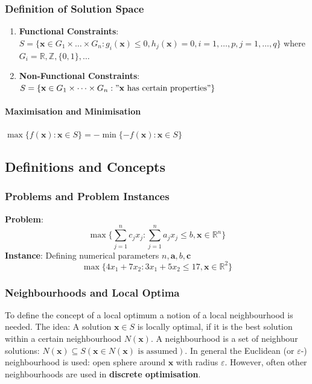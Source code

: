 \documentclass[11pt]{article}
\begin{document}
\subsubsection{Definition of Solution Space}
\begin{enumerate}[label=\roman*)]
	\item \textbf{Functional Constraints}:\\
	$S = \{ \textbf{x}\in G_1\times\dots\times G_n : g_i(\textbf{x})\leq 0, h_j (\textbf{x}) = 0, i=1,\dots,p,j=1,\dots,q \}$ where $G_i = \mathbb{R},\mathbb{Z},\{0,1\},\dots$
	\item \textbf{Non-Functional Constraints}:\\
	$S = \{ \textbf{x}\in G_1\times\dots\times G_n : "\textbf{x} \text{ has certain properties}" \} $
\end{enumerate}

\paragraph{Maximisation and Minimisation} $\max\{f(\textbf{x}):\textbf{x}\in S\} = - \min\{-f(\textbf{x}):\textbf{x}\in S\}$

\subsection{Definitions and Concepts}

\subsubsection{Problems and Problem Instances}
\textbf{Problem}:
\begin{equation*}
	\max\{\sum_{j=1}^{n}c_j x_j:\sum_{j=1}^{n}a_j x_j \leq b, \textbf{x}\in \mathbb{R}^n\}
\end{equation*}
\noindent
\textbf{Instance}: Defining numerical parameters $n,\textbf{a},b,\textbf{c}$
\begin{equation*}
\max\{4x_1 + 7 x_2 : 3x_1 + 5 x_2 \leq 17, \textbf{x}\in \mathbb{R}^2\}
\end{equation*}

\subsubsection{Neighbourhoods and Local Optima}
To define the concept of a local optimum a notion of a local neighbourhood is needed. The idea: A solution $\textbf{x}\in S$ is locally optimal, if it is the best solution within a certain neighbourhood $N(\textbf{x})$. A neighbourhood is a set of neighbour solutions: $N(\textbf{x})\subseteq S (\textbf{x} \in N(\textbf{x})\text{ is assumed})$. In general the Euclidean (or $\varepsilon$-) neighbourhood is used: open sphere around $\textbf{x}$ with radius $\varepsilon$. However, often other neighbourhoods are used in \textbf{discrete optimisation}.
\end{document}
